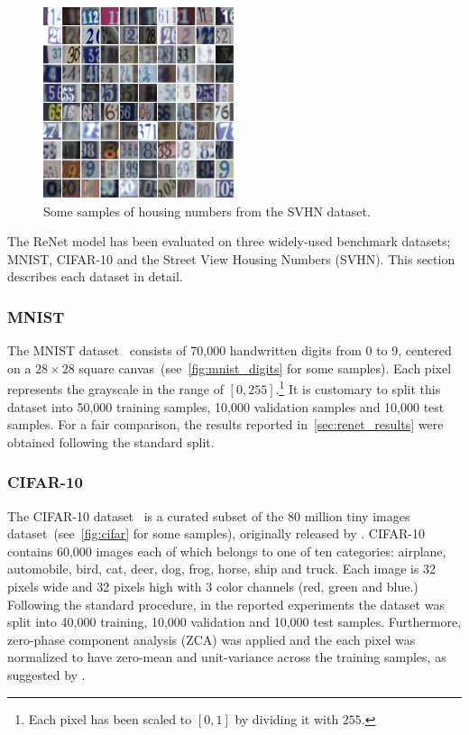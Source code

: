 \begin{figure}[!t]
    \centering
    \includegraphics[width=0.5\textwidth]{img/renet/SVHN.png}
    \caption{Some samples of housing numbers from the SVHN dataset.}
    \label{fig:svhn}
\end{figure}

The ReNet model has been evaluated on three widely-used benchmark datasets;
MNIST, CIFAR-10 and the Street View Housing Numbers (SVHN). This section
describes each dataset in detail.

\subsubsection{MNIST}
The MNIST dataset~\citep{Lecun99objectrecognition} consists of 70,000
handwritten digits from 0 to 9, centered on a $28\times 28$ square
canvas~(see~\autoref{fig:mnist_digits} for some samples). Each pixel represents
the grayscale in the range of $\left[0, 255\right]$.\footnote{Each pixel has
been scaled to $[0, 1]$ by dividing it with $255$.} It is customary to split
this dataset into 50,000 training samples, 10,000 validation samples and 10,000
test samples. For a fair comparison, the results reported
in~\autoref{sec:renet_results} were obtained following the standard split.

\subsubsection{CIFAR-10}
The CIFAR-10 dataset~\citep{KrizhevskyHinton2009} is a curated subset of the 80
million tiny images dataset~(see~\autoref{fig:cifar} for some samples),
originally released by \citet{Torralba+Fergus+Freeman-2008}. CIFAR-10 contains
60,000 images each of which belongs to one of ten categories: airplane,
automobile, bird, cat, deer, dog, frog, horse, ship and truck. Each image is 32
pixels wide and 32 pixels high with 3 color channels (red, green and blue.)
Following the standard procedure, in the reported experiments the dataset
was split into 40,000 training, 10,000 validation and 10,000 test samples.
Furthermore, zero-phase component analysis (ZCA) was applied and the each pixel
was normalized to have zero-mean and unit-variance across the training samples,
as suggested by \citet{KrizhevskyHinton2009}.

